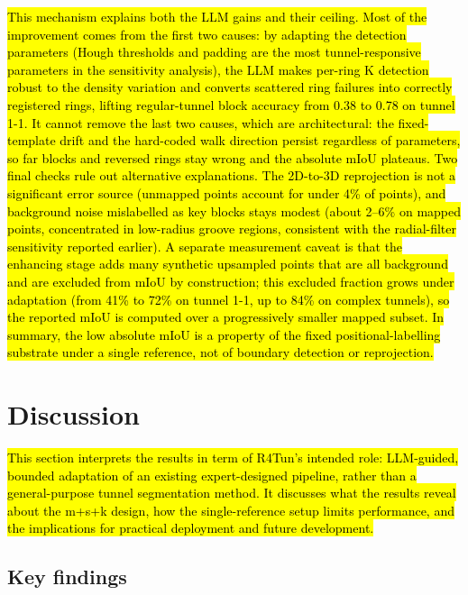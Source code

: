 \documentclass[a4paper,fleqn]{cas-dc}
\begin{document}
{\hl{This mechanism explains both the LLM gains and their ceiling. Most of the improvement comes from the first two causes: by adapting the detection parameters (Hough thresholds and padding are the most tunnel-responsive parameters in the sensitivity analysis), the LLM makes per-ring K detection robust to the density variation and converts scattered ring failures into correctly registered rings, lifting regular-tunnel block accuracy from 0.38 to 0.78 on tunnel 1-1. It cannot remove the last two causes, which are architectural: the fixed-template drift and the hard-coded walk direction persist regardless of parameters, so far blocks and reversed rings stay wrong and the absolute mIoU plateaus. Two final checks rule out alternative explanations. The 2D-to-3D reprojection is not a significant error source (unmapped points account for under 4\% of points), and background noise mislabelled as key blocks stays modest (about 2--6\% on mapped points, concentrated in low-radius groove regions, consistent with the radial-filter sensitivity reported earlier). A separate measurement caveat is that the enhancing stage adds many synthetic upsampled points that are all background and are excluded from mIoU by construction; this excluded fraction grows under adaptation (from 41\% to 72\% on tunnel 1-1, up to 84\% on complex tunnels), so the reported mIoU is computed over a progressively smaller mapped subset. In summary, the low absolute mIoU is a property of the fixed positional-labelling substrate under a single reference, not of boundary detection or reprojection.}



\section{Discussion}\label{sec:discussion}

\hl{This section interprets the results in term of R4Tun's intended role: LLM-guided, bounded adaptation of an existing expert-designed pipeline, rather than a general-purpose tunnel segmentation method. It discusses what the results reveal about the m+s+k design, how the single-reference setup limits performance, and the implications for practical deployment and future development.}

\subsection{Key findings}

}
\end{document}
